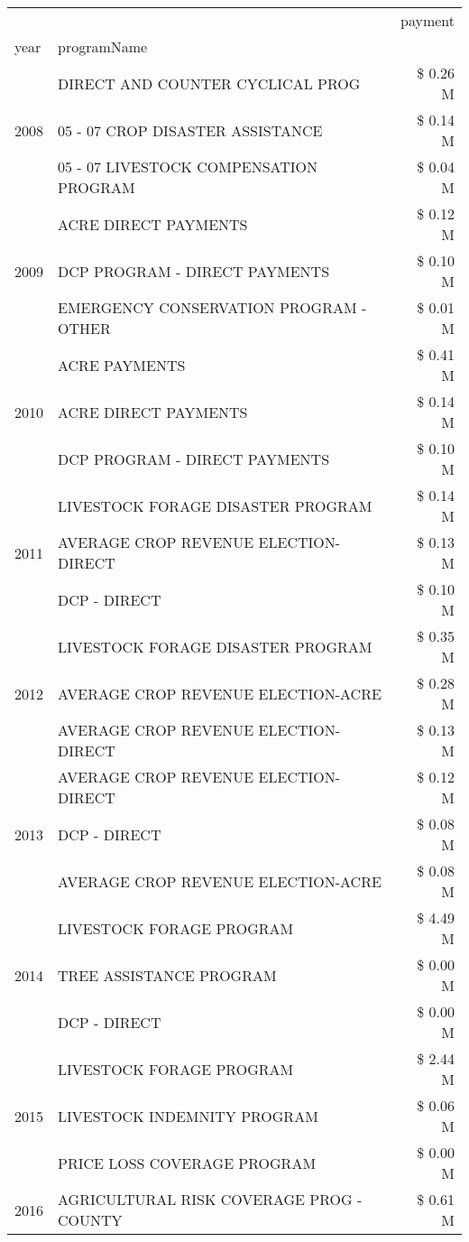 \begin{tabular}{llr}
\toprule
 &  & payment \\
year & programName &  \\
\midrule
\multirow[t]{3}{*}{2008} & DIRECT AND COUNTER CYCLICAL PROG & \$ 0.26 M \\
 & 05 - 07 CROP DISASTER ASSISTANCE & \$ 0.14 M \\
 & 05 - 07 LIVESTOCK COMPENSATION PROGRAM & \$ 0.04 M \\
\cline{1-3}
\multirow[t]{3}{*}{2009} & ACRE DIRECT PAYMENTS & \$ 0.12 M \\
 & DCP PROGRAM - DIRECT PAYMENTS & \$ 0.10 M \\
 & EMERGENCY CONSERVATION PROGRAM - OTHER & \$ 0.01 M \\
\cline{1-3}
\multirow[t]{3}{*}{2010} & ACRE PAYMENTS & \$ 0.41 M \\
 & ACRE DIRECT PAYMENTS & \$ 0.14 M \\
 & DCP PROGRAM - DIRECT PAYMENTS & \$ 0.10 M \\
\cline{1-3}
\multirow[t]{3}{*}{2011} & LIVESTOCK FORAGE DISASTER PROGRAM & \$ 0.14 M \\
 & AVERAGE CROP REVENUE ELECTION-DIRECT & \$ 0.13 M \\
 & DCP - DIRECT & \$ 0.10 M \\
\cline{1-3}
\multirow[t]{3}{*}{2012} & LIVESTOCK FORAGE DISASTER PROGRAM & \$ 0.35 M \\
 & AVERAGE CROP REVENUE ELECTION-ACRE & \$ 0.28 M \\
 & AVERAGE CROP REVENUE ELECTION-DIRECT & \$ 0.13 M \\
\cline{1-3}
\multirow[t]{3}{*}{2013} & AVERAGE CROP REVENUE ELECTION-DIRECT & \$ 0.12 M \\
 & DCP - DIRECT & \$ 0.08 M \\
 & AVERAGE CROP REVENUE ELECTION-ACRE & \$ 0.08 M \\
\cline{1-3}
\multirow[t]{3}{*}{2014} & LIVESTOCK FORAGE PROGRAM & \$ 4.49 M \\
 & TREE ASSISTANCE PROGRAM & \$ 0.00 M \\
 & DCP - DIRECT & \$ 0.00 M \\
\cline{1-3}
\multirow[t]{3}{*}{2015} & LIVESTOCK FORAGE PROGRAM & \$ 2.44 M \\
 & LIVESTOCK INDEMNITY PROGRAM & \$ 0.06 M \\
 & PRICE LOSS COVERAGE PROGRAM & \$ 0.00 M \\
\cline{1-3}
\multirow[t]{3}{*}{2016} & AGRICULTURAL RISK COVERAGE PROG - COUNTY & \$ 0.61 M \\

\end{tabular}

